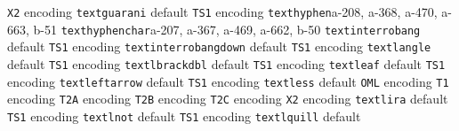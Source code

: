 \documentclass[twoside]{ltxdoc}
\makeatletter
\renewenvironment{theindex}{%
   \@restonecoltrue
   \if@twocolumn\@restonecolfalse\fi
   \columnseprule \z@
   \columnsep 35\p@
   \twocolumn[\index@prologue]%
   \IndexParms
   \let\item\@idxitem
   \ignorespaces
}{\if@restonecol\onecolumn\else\clearpage\fi}
\makeatother
\begin{document}
\begin{theindex}
    \subitem \texttt  {X2} encoding\pfill {}
  \item \texttt  {textguarani}\efill 
    \subitem default\pfill {}
    \subitem \texttt  {TS1} encoding\pfill {}
  \item \texttt  {texthyphen}\pfill a-208, a-368, a-470, 
                a-663, b-51
  \item \texttt  {texthyphenchar}\pfill a-207, a-367, 
                a-469, a-662, b-50
  \item \texttt  {textinterrobang}\efill 
    \subitem default\pfill {}
    \subitem \texttt  {TS1} encoding\pfill {}
  \item \texttt  {textinterrobangdown}\efill 
    \subitem default\pfill {}
    \subitem \texttt  {TS1} encoding\pfill {}
  \item \texttt  {textlangle}\efill 
    \subitem default\pfill {}
    \subitem \texttt  {TS1} encoding\pfill {}
  \item \texttt  {textlbrackdbl}\efill 
    \subitem default\pfill {}
    \subitem \texttt  {TS1} encoding\pfill {}
  \item \texttt  {textleaf}\efill 
    \subitem default\pfill {}
    \subitem \texttt  {TS1} encoding\pfill {}
  \item \texttt  {textleftarrow}\efill 
    \subitem default\pfill {}
    \subitem \texttt  {TS1} encoding\pfill {}
  \item \texttt  {textless}\efill 
    \subitem default\pfill {}
    \subitem \texttt  {OML} encoding\pfill {}
    \subitem \texttt  {T1} encoding\pfill {}
    \subitem \texttt  {T2A} encoding\pfill {}
    \subitem \texttt  {T2B} encoding\pfill {}
    \subitem \texttt  {T2C} encoding\pfill {}
    \subitem \texttt  {X2} encoding\pfill {}
  \item \texttt  {textlira}\efill 
    \subitem default\pfill {}
    \subitem \texttt  {TS1} encoding\pfill {}
  \item \texttt  {textlnot}\efill 
    \subitem default\pfill {}
    \subitem \texttt  {TS1} encoding\pfill {}
  \item \texttt  {textlquill}\efill 
    \subitem default\pfill {}

\end{theindex}
\end{document}
